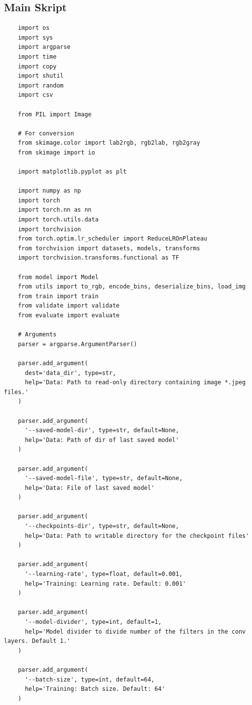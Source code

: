 \subsection{Main Skript}
\begin{longlisting}
  \begin{verbatim}
    import os
    import sys
    import argparse
    import time
    import copy
    import shutil
    import random
    import csv

    from PIL import Image

    # For conversion
    from skimage.color import lab2rgb, rgb2lab, rgb2gray
    from skimage import io

    import matplotlib.pyplot as plt

    import numpy as np
    import torch
    import torch.nn as nn
    import torch.utils.data
    import torchvision
    from torch.optim.lr_scheduler import ReduceLROnPlateau
    from torchvision import datasets, models, transforms
    import torchvision.transforms.functional as TF

    from model import Model
    from utils import to_rgb, encode_bins, deserialize_bins, load_img
    from train import train
    from validate import validate
    from evaluate import evaluate

    # Arguments
    parser = argparse.ArgumentParser()

    parser.add_argument(
      dest='data_dir', type=str,
      help='Data: Path to read-only directory containing image *.jpeg files.'
    )

    parser.add_argument(
      '--saved-model-dir', type=str, default=None,
      help='Data: Path of dir of last saved model'
    )

    parser.add_argument(
      '--saved-model-file', type=str, default=None,
      help='Data: File of last saved model'
    )

    parser.add_argument(
      '--checkpoints-dir', type=str, default=None,
      help='Data: Path to writable directory for the checkpoint files'
    )

    parser.add_argument(
      '--learning-rate', type=float, default=0.001,
      help='Training: Learning rate. Default: 0.001'
    )

    parser.add_argument(
      '--model-divider', type=int, default=1,
      help='Model divider to divide number of the filters in the conv layers. Default 1.'
    )

    parser.add_argument(
      '--batch-size', type=int, default=64,
      help='Training: Batch size. Default: 64'
    )


\end{verbatim}
\end{longlisting}
